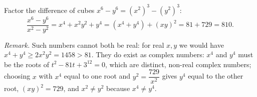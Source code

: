 Factor the difference of cubes $x^6-y^6=\left(x^2\right)^3-\left(y^2\right)^3$:
\[\dfrac{x^6-y^6}{x^2-y^2}=x^4+x^2y^2+y^4=\left(x^4+y^4\right)+(xy)^2=81+729=\boxed{810}.\]

\emph{Remark.} Such numbers cannot both be real: for real $x,y$ we would have $x^4+y^4\ge2x^2y^2=1458>81$. They do exist as complex numbers: $x^4$ and $y^4$ must be the roots of $t^2-81t+3^{12}=0$, which are distinct, non-real complex numbers; choosing $x$ with $x^4$ equal to one root and $y^2=\dfrac{729}{x^2}$ gives $y^4$ equal to the other root, $(xy)^2=729$, and $x^2\ne y^2$ because $x^4\ne y^4$.
